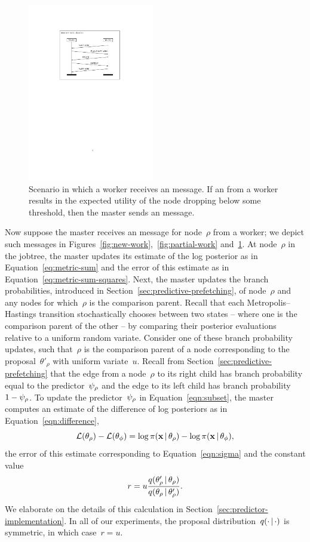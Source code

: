 \documentclass[angelino.tex]{subfiles}
\begin{document}
\begin{figure}[t]
\centering
\includegraphics[width=0.49\textwidth]{figs/protocol/new-work-abandon.pdf}
\caption{Scenario in which a worker receives an \ABANDON message.
If an \UPDATE from a worker results in the expected utility of the node dropping
below some threshold, then the master sends an \ABANDON message.}
\label{fig:abandon}
\end{figure}


Now suppose the master receives an \UPDATE message for node~$\rho$ from a worker;
we depict such messages in Figures~\ref{fig:new-work},~\ref{fig:partial-work}
and~\ref{fig:abandon}.
%
At node~$\rho$ in the jobtree, the master updates its estimate of the log
posterior as in Equation~\ref{eq:metric-sum} and the error of this estimate
as in Equation~\ref{eq:metric-sum-squares}.
%
Next, the master updates the branch probabilities, introduced in 
Section~\ref{sec:predictive-prefetching},
of node~$\rho$ and any nodes for which~$\rho$ is the comparison parent.
%
Recall that each Metropolis--Hastings transition stochastically chooses between
two states -- where one is the comparison parent of the other -- by comparing
their posterior evaluations relative to a uniform random variate.
%
Consider one of these branch probability updates, such that~$\rho$ is the
comparison parent of a node corresponding to the proposal~$\theta'_\rho$
with uniform variate~$u$.
%
Recall from Section~\ref{sec:predictive-prefetching} that 
the edge from a node~$\rho$ to its right child has branch probability equal to
the predictor~$\psi_{\rho}$ and the edge to its left child has
branch probability~${1 - \psi_{\rho}}$.
%
To update the predictor~$\psi_{\rho}$ in Equation~\ref{eqn:subset},
the master computes an estimate of the difference of log posteriors as in
Equation~\ref{eqn:difference},
\[
{\mathcal{L}}(\theta_\rho) - {\mathcal{L}}(\theta_\phi) =
\log \pi(\mathbf{x} \,|\, \theta_\rho) - \log \pi(\mathbf{x} \,|\, \theta_\phi),
\]
the error of this estimate corresponding to Equation~\ref{eqn:sigma}
and the constant value
\[
r = u \frac{q(\theta'_\rho \,|\, \theta_\rho)}{q(\theta_\rho \,|\, \theta'_\rho)}.
\]
We elaborate on the details of this calculation in Section~\ref{sec:predictor-implementation}.
In all of our experiments, the proposal distribution~$q(\cdot \,|\, \cdot)$ is
symmetric, in which case~$r = u$.
\end{document}
